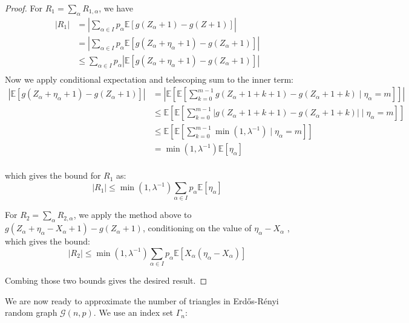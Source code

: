 \documentclass{article}
\begin{document}
\begin{proof}
    For $R_1=\sum_\alpha R_{1,\alpha}$, we have
    \begin{align*}
        |R_1| &= \left|\sum_{\alpha \in I} p_\alpha \mathbb{E}[g(Z_\alpha+1) - g(Z+1)]\right| \\
        &= \left|\sum_{\alpha \in I} p_\alpha \mathbb{E}[g(Z_\alpha + \eta_\alpha +1) - g(Z_\alpha+1)]\right|\\
        &\leq \sum_{\alpha \in I} p_\alpha |\mathbb{E}[g(Z_\alpha + \eta_\alpha +1) - g(Z_\alpha+1)]|\\
    \end{align*}
    Now we apply conditional expectation and telescoping sum to the inner term:
    \begin{align*}
        |\mathbb{E}[g(Z_\alpha + \eta_\alpha +1) - g(Z_\alpha+1)]| &= \left|\mathbb{E}\left[\mathbb{E}[\sum_{k=0}^{m-1} g(Z_\alpha + 1 + k+1) - g(Z_\alpha + 1 + k)\mid \eta_\alpha = m]\right]\right|\\
        &\leq \mathbb{E}\left[\mathbb{E}[\sum_{k=0}^{m-1} |g(Z_\alpha + 1 + k+1) - g(Z_\alpha + 1 + k)|\mid \eta_\alpha = m]\right]\\
        &\leq \mathbb{E}\left[\mathbb{E}[\sum_{k=0}^{m-1} \min (1, \lambda^{-1})\mid \eta_\alpha = m]\right]\\
        &= \min (1, \lambda^{-1}) \mathbb{E}[ \eta_\alpha]\\
    \end{align*}

    which gives the bound for $R_1$ as:
    \begin{equation*}
        |R_1| \leq \min (1, \lambda^{-1}) \sum_{\alpha \in I} p_\alpha \mathbb{E}[ \eta_\alpha]
    \end{equation*}

    For $R_2=\sum_\alpha R_{2,\alpha}$, we apply the method above to $g(Z_\alpha + \eta_\alpha - X_\alpha + 1) - g(Z_\alpha + 1)$, conditioning on the value of $\eta_\alpha - X_\alpha$ , which gives the bound:
    \begin{equation*}
        |R_2| \leq \min (1, \lambda^{-1}) \sum_{\alpha \in I} p_\alpha \mathbb{E}[ X_\alpha (\eta_\alpha - X_\alpha)]
    \end{equation*}

    Combing those two bounds gives the desired result.
\end{proof}  

We are now ready to approximate the number of triangles in Erd\H{o}s-R\'{e}nyi random graph $\mathcal{G}(n,p)$.  We use an index set $\Gamma_n$:
\end{document}
